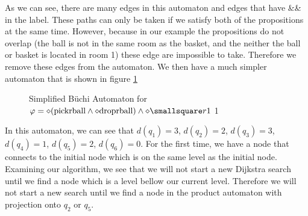 As we can see, there are many edges in this automaton and edges that have \&\& in the label. These paths can only be taken if we satisfy both of the propositions at the same time. However, because in our example the propositions do not overlap (the ball is not in the same room as the basket, and the neither the ball or basket is located in room 1) these edge are impossible to take. Therefore we remove these edges from the automaton. We then have a much simpler automaton that is shown in figure \ref{fig:ex1SimplifiedBuchi}

\begin{figure}
\centering
{}
\caption{Simplified B\"uchi Automaton for $\varphi = \diamond (\text{pickrball} \wedge \diamond \text{droprball}) \wedge \diamond \smallsquare r1$ 1}
\label{fig:ex1SimplifiedBuchi}
\end{figure} 

In this automaton, we can see that $d(q_1)=3$, $d(q_2)=2$, $d(q_3)=3$, $d(q_4)=1$, $d(q_5)=2$, $d(q_6)=0$. For the first time, we have a node that connects to the initial node which is on the same level as the initial node. Examining our algorithm, we see that we will not start a new Dijkstra search until we find a node which is a level bellow our current level. Therefore we will not start a new search until we find a node in the product automaton with projection onto $q_2$ or $q_5$.


